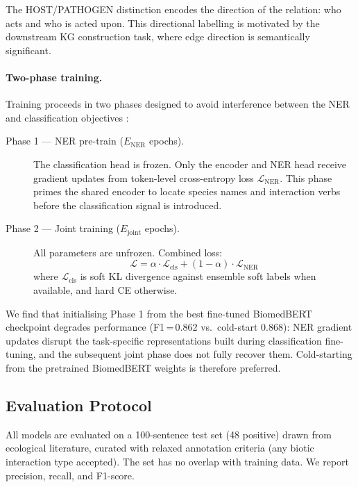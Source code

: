 \documentclass[12pt,a4paper]{article}
\begin{document}
The HOST/PATHOGEN distinction encodes the direction of the relation: who
acts and who is acted upon. This directional labelling is motivated by the
downstream KG construction task, where edge direction is semantically
significant.

\paragraph{Two-phase training.}
Training proceeds in two phases designed to avoid interference between
the NER and classification objectives \citep{liu2019multi}:

\begin{description}
    \item[Phase 1 --- NER pre-train ($E_\text{NER}$ epochs).]
    The classification head is frozen. Only the encoder and NER head receive
    gradient updates from token-level cross-entropy loss
    $\mathcal{L}_\text{NER}$.
    This phase primes the shared encoder to locate species names and
    interaction verbs before the classification signal is introduced.

    \item[Phase 2 --- Joint training ($E_\text{joint}$ epochs).]
    All parameters are unfrozen. Combined loss:
    \[
        \mathcal{L} = \alpha \cdot \mathcal{L}_\text{cls} +
                      (1{-}\alpha) \cdot \mathcal{L}_\text{NER}
    \]
    where $\mathcal{L}_\text{cls}$ is soft KL divergence against ensemble
    soft labels when available, and hard CE otherwise.
\end{description}

We find that initialising Phase 1 from the best fine-tuned BiomedBERT
checkpoint degrades performance (F1\,=\,0.862 vs.\ cold-start 0.868):
NER gradient updates disrupt the task-specific representations built during
classification fine-tuning, and the subsequent joint phase does not fully
recover them. Cold-starting from the pretrained BiomedBERT weights is
therefore preferred.

\subsection{Evaluation Protocol}
\label{sec:eval}

All models are evaluated on a 100-sentence test set (48 positive)
drawn from ecological literature, curated with relaxed annotation criteria
(any biotic interaction type accepted). The set has no overlap with
training data. We report precision, recall, and F1-score.
\end{document}

